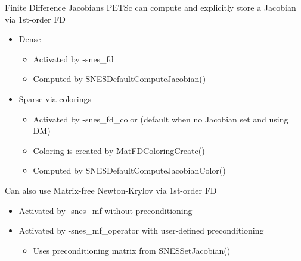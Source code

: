 \begin{frame}{Finite Difference Jacobians}
  PETSc can compute and explicitly store a Jacobian via 1st-order FD
  \begin{itemize}
  \item Dense
    \begin{itemize}
    \item Activated by {\kb -snes\_fd}
    \item Computed by {\kb SNESDefaultComputeJacobian()}
    \end{itemize}
  \item Sparse via colorings
    \begin{itemize}
    \item Activated by {\kb -snes\_fd\_color} (default when no Jacobian set and using DM)
    \item Coloring is created by {\kb MatFDColoringCreate()}
    \item Computed by {\kb SNESDefaultComputeJacobianColor()}
    \end{itemize}
  \end{itemize}
  Can also use Matrix-free Newton-Krylov via 1st-order FD
  \begin{itemize}
  \item Activated by {\kb -snes\_mf} without preconditioning
  \item Activated by {\kb -snes\_mf\_operator} with user-defined preconditioning
    \begin{itemize}
    \item Uses preconditioning matrix from {\kb SNESSetJacobian()}
    \end{itemize}
  \end{itemize}
\end{frame}
